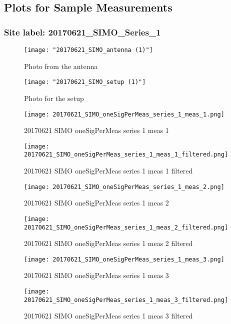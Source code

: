 \subsection{Plots for Sample Measurements}
\subsubsection{Site label: 20170621\_SIMO\_Series\_1}
\begin{figure}[ht] \caption{Photo from the antenna}
\texttt{[image: "20170621\_SIMO\_antenna (1)"]}\centering\end{figure}
\begin{figure}[ht] \caption{Photo for the setup}
\texttt{[image: "20170621\_SIMO\_setup (1)"]}\centering\end{figure}
\begin{figure}[ht] \caption{20170621 SIMO oneSigPerMeas series 1 meas 1}
\texttt{[image: 20170621\_SIMO\_oneSigPerMeas\_series\_1\_meas\_1.png]}\centering\end{figure}
\begin{figure}[ht] \caption{20170621 SIMO oneSigPerMeas series 1 meas 1 filtered}
\texttt{[image: 20170621\_SIMO\_oneSigPerMeas\_series\_1\_meas\_1\_filtered.png]}\centering\end{figure}
\begin{figure}[ht] \caption{20170621 SIMO oneSigPerMeas series 1 meas 2}
\texttt{[image: 20170621\_SIMO\_oneSigPerMeas\_series\_1\_meas\_2.png]}\centering\end{figure}
\begin{figure}[ht] \caption{20170621 SIMO oneSigPerMeas series 1 meas 2 filtered}
\texttt{[image: 20170621\_SIMO\_oneSigPerMeas\_series\_1\_meas\_2\_filtered.png]}\centering\end{figure}
\begin{figure}[ht] \caption{20170621 SIMO oneSigPerMeas series 1 meas 3}
\texttt{[image: 20170621\_SIMO\_oneSigPerMeas\_series\_1\_meas\_3.png]}\centering\end{figure}
\begin{figure}[ht] \caption{20170621 SIMO oneSigPerMeas series 1 meas 3 filtered}
\texttt{[image: 20170621\_SIMO\_oneSigPerMeas\_series\_1\_meas\_3\_filtered.png]}\centering\end{figure}
\clearpage
